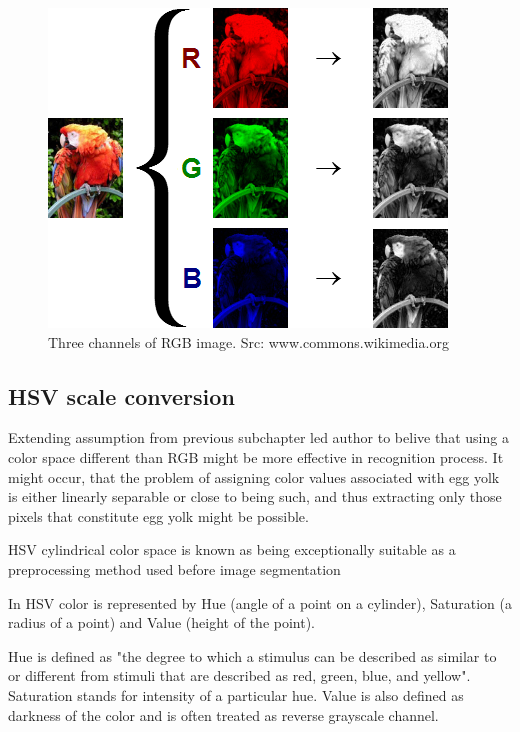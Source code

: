 \documentclass[12pt,twoside,a4paper]{article}
\begin{document}
\begin{figure}[H]
\centering
\includegraphics[width=0.4\paperwidth]{rgb}
\caption{Three channels of RGB image. Src: www.commons.wikimedia.org}
\end{figure}


\subsection{HSV scale conversion}

Extending assumption from previous subchapter led author to belive that using a color space different than RGB might be more effective in recognition process.
It might occur, that the problem of assigning color values associated with egg yolk is either linearly separable or close to being such, and thus extracting only those pixels that constitute egg yolk might be possible.

HSV cylindrical color space is known as being exceptionally suitable as a preprocessing method used before image segmentation \cite{hsv}

In HSV color is represented by Hue (angle of a point on a cylinder), Saturation (a radius of a point) and Value (height of the point).

Hue is defined as "the degree to which a stimulus can be described as similar to or different from stimuli that are described as red, green, blue, and yellow"\cite{hue}.
Saturation stands for intensity of a particular hue.
Value is also defined as darkness of the color and is often treated as reverse grayscale channel.
\end{document}
